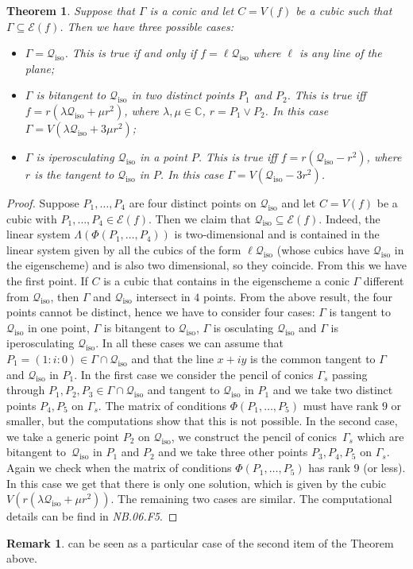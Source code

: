 \documentclass[a4paper, 11pt, reqno]{amsart}
\theoremstyle{plain}
\newtheorem{theorem}[lemma]{Theorem}
\theoremstyle{definition}
\newtheorem{rmk}[lemma]{Remark}
\newcommand{\nb}[2]{\textsl{{NB}.{#1}.{#2}}}
\newcommand{\iso}{\mathcal{Q}_{\mathrm{iso}}}
\newcommand{\Eig}[1]{\mathcal{E}\!\left( {#1} \right)}
\begin{document}
\begin{theorem} Suppose that $\Gamma$ is a conic and let $C=V(f)$ be a cubic such that $\Gamma \subseteq \Eig{f}$. Then we have three possible cases:
    \begin{itemize}
        \item $\Gamma = \iso$. This is true if and only if $f = \ell\iso$ where $\ell$ is any line of the plane;
        \item $\Gamma$ is bitangent to $\iso$ in two distinct points $P_1$ and $P_2$. This is true iff $f = r(\lambda \iso+ \mu r^2)$, where $\lambda, \mu \in \mathbb{C}$, $r = P_1 \vee P_2$. In this case $\Gamma = V(\lambda \iso+3 \mu r^2)$;
        \item $\Gamma$ is iperosculating $\iso$ in a point $P$. This is true iff $f = r(\iso-r^2)$, where $r$ is the tangent to $\iso$ in $P$. In this case
        $\Gamma = V(\iso-3r^2)$.
    \end{itemize}
\end{theorem}
\begin{proof} Suppose $P_1, \dots, P_4$ are four distinct points on $\iso$ and let $C=V(f)$ be a cubic with $P_1, \dots, P_4\in \Eig{f}$. Then we claim that
$\iso\subseteq \Eig{f}$. Indeed, the linear system $\Lambda(\Phi(P_1, \dotsc, P_4))$ is two-dimensional and is contained in the linear system given by all the cubics of the form $\ell \iso$ (whose cubics have $\iso$ in the eigenscheme) and is also two dimensional, so they coincide. From this we have the first point. If $C$ is a cubic that contains in the eigenscheme a conic $\Gamma$ different from $\iso$, then $\Gamma$ and $\iso$ intersect in $4$ points. From the above result, the four points cannot be distinct, hence we have to consider four cases: $\Gamma$ is tangent to $\iso$ in one point, $\Gamma$ is bitangent to
$\iso$, $\Gamma$ is osculating $\iso$ and $\Gamma$ is iperosculating $\iso$. In all these cases we can assume that
$P_1 = (1: i: 0) \in \Gamma \cap \iso$ and that
the line $x+iy$ is the common tangent to $\Gamma$ and $\iso$ in $P_1$.
In the first case we consider the pencil of conics $\Gamma_s$ passing through $P_1, P_2, P_3\in \Gamma \cap \iso$ and tangent to $\iso$ in $P_1$ and
we take two distinct points $P_4, P_5$ on $\Gamma_s$. The matrix of conditions
$\Phi(P_1, \dotsc, P_5)$ must have rank $9$ or smaller, but the computations show that
this is not possible. In the second case, we take a generic point $P_2$ on $\iso$, we construct
the pencil of conics~$\Gamma_s$ which are bitangent to~$\iso$ in $P_1$ and $P_2$ and we take three other points $P_3, P_4, P_5$
on $\Gamma_s$. Again we check when the matrix of conditions $\Phi(P_1, \dotsc, P_5)$ has rank $9$ (or less). In this case we get that there is only one solution, which is given by the cubic
$V(r(\lambda \iso+\mu r^2))$. The remaining two cases are similar. The computational details can be find in \nb{06}{F5}.
\end{proof}
\begin{rmk}
     can be seen as a particular case of the second item of the Theorem above.
\end{rmk}
\end{document}
